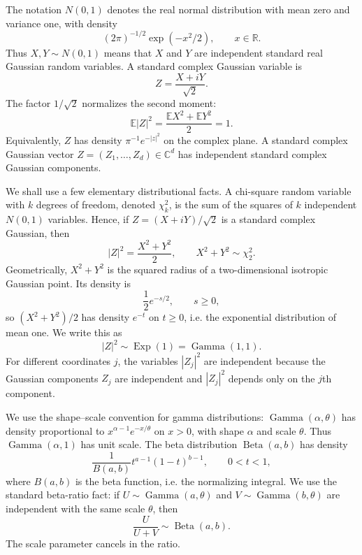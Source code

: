 \documentclass[aps,pra,reprint,superscriptaddress,nofootinbib,longbibliography]{revtex4-2}
\newcommand{\E}{\mathbb{E}}
\begin{document}
The notation $N(0,1)$ denotes the real normal distribution with mean zero and
variance one, with density
\begin{equation}
    (2\pi)^{-1/2}\exp(-x^2/2),
    \qquad x\in\mathbb R .
\end{equation}
Thus $X,Y\sim N(0,1)$ means that $X$ and $Y$ are independent standard real
Gaussian random variables.  A standard complex Gaussian variable is
\begin{equation}
    Z=\frac{X+iY}{\sqrt2}.
    \label{eq:standard-complex-gaussian}
\end{equation}
The factor $1/\sqrt2$ normalizes the second moment:
\begin{equation}
    \E |Z|^2
    =
    \frac{\E X^2+\E Y^2}{2}
    =1 .
\end{equation}
Equivalently, $Z$ has density $\pi^{-1}e^{-|z|^2}$ on the complex plane.  A
standard complex Gaussian vector $Z=(Z_1,\ldots,Z_d)\in\mathbb C^d$ has
independent standard complex Gaussian components.

We shall use a few elementary distributional facts.  A chi-square random
variable with $k$ degrees of freedom, denoted $\chi^2_k$, is the sum of the
squares of $k$ independent $N(0,1)$ variables.  Hence, if
$Z=(X+iY)/\sqrt2$ is a standard complex Gaussian, then
\begin{equation}
    |Z|^2
    =
    \frac{X^2+Y^2}{2},
    \qquad
    X^2+Y^2\sim\chi^2_2 .
\end{equation}
Geometrically, $X^2+Y^2$ is the squared radius of a two-dimensional isotropic
Gaussian point.  Its density is
\begin{equation}
    \frac12 e^{-s/2},
    \qquad s\geq0,
\end{equation}
so $(X^2+Y^2)/2$ has density $e^{-t}$ on $t\geq0$, i.e. the exponential
distribution of mean one.  We write this as
\begin{equation}
    |Z|^2\sim\operatorname{Exp}(1)
    =
    \operatorname{Gamma}(1,1).
\end{equation}
For different coordinates $j$, the variables $|Z_j|^2$ are independent because
the Gaussian components $Z_j$ are independent and $|Z_j|^2$ depends only on the
$j$th component.

We use the shape--scale convention for gamma distributions:
$\operatorname{Gamma}(\alpha,\theta)$ has density proportional to
$x^{\alpha-1}e^{-x/\theta}$ on $x>0$, with shape $\alpha$ and scale
$\theta$.  Thus $\operatorname{Gamma}(\alpha,1)$ has unit scale.  The beta
distribution $\operatorname{Beta}(a,b)$ has density
\begin{equation}
    \frac{1}{B(a,b)}t^{a-1}(1-t)^{b-1},
    \qquad 0<t<1,
\end{equation}
where $B(a,b)$ is the beta function, i.e. the normalizing integral.  We use the
standard beta-ratio fact: if $U\sim\operatorname{Gamma}(a,\theta)$ and
$V\sim\operatorname{Gamma}(b,\theta)$ are independent with the same scale
$\theta$, then
\begin{equation}
    \frac{U}{U+V}\sim\operatorname{Beta}(a,b).
\end{equation}
The scale parameter cancels in the ratio.
\end{document}
